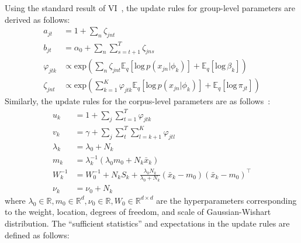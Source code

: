 \documentclass{article}
\begin{document}
Using the standard result of VI~\cite{bishop2006pattern, 10.1214/06-BA104, DBLP:journals/jmlr/WangPB11}, the update rules for group-level parameters are derived as follows:
\begin{align}
\label{eq:doc_update:a} a_{jt} &= \textstyle 1 +  \sum_{n}\zeta_{jnt} \\
\label{eq:doc_update:b} b_{jt} &= \textstyle \alpha_{0} +  \sum_{n}\sum^{T}_{s=t+1}\zeta_{jns} \\
\label{eq:doc_update:varphi} \varphi_{jtk} &\propto \text{exp}(\textstyle \sum_{n}\zeta_{jnt}\mathbb{E}_{q}[\text{log}\,p(x_{jn}|\phi_{k})] + \mathbb{E}_{q}[\text{log}\,\beta_{k}]) \\
\label{eq:doc_update:zeta} \zeta_{jnt} &\propto \text{exp}(\textstyle \sum_{k=1}^{K} \varphi_{jtk} \mathbb{E}_{q}[\text{log}\,p(x_{jn}|\phi_{k})] + \mathbb{E}_{q}[\text{log}\,\pi_{jt}])
\end{align}
Similarly, the update rules for the corpus-level parameters are as follows~\cite{bishop2006pattern}:
\begin{align}
\label{eq:corpus_update:u} u_{k} &= 1 + \textstyle \sum_{j}\sum_{t=1}^{T} \varphi_{jtk} \\
\label{eq:corpus_update:v} v_{k} &= \gamma + \textstyle \sum_{j}\sum_{t}^{T}\sum_{l=k+1}^{K} \varphi_{jtl} \\
\label{eq:corpus_update:lambda} \lambda_{k} &= \lambda_{0} + N_{k} \\
\label{eq:corpus_update:m} m_{k} &= \lambda_{k}^{-1} (\lambda_{0}m_{0} + N_{k}\bar{x}_{k}) \\
\label{eq:corpus_update:W} W_{k}^{-1} &= W_{0}^{-1} + N_{k}S_{k} + \frac{\lambda_{0}N_{k}}{\lambda_{0} + N_{k}} (\bar{x}_{k} - m_{0})(\bar{x}_{k} - m_{0})^{\intercal} \\
\label{eq:corpus_update:nu} \nu_{k} &= \nu_{0} + N_{k}
\end{align}
where $\lambda_{0}\in\mathbb{R}, m_{0}\in\mathbb{R}^{d}, \nu_{0}\in\mathbb{R}, W_{0}\in\mathbb{R}^{d\times d}$ are the hyperparameters corresponding to the weight, location, degrees of freedom, and scale of Gaussian-Wishart distribution. The ``sufficient statistics'' and expectations in the update rules are defined as follows:
\end{document}
